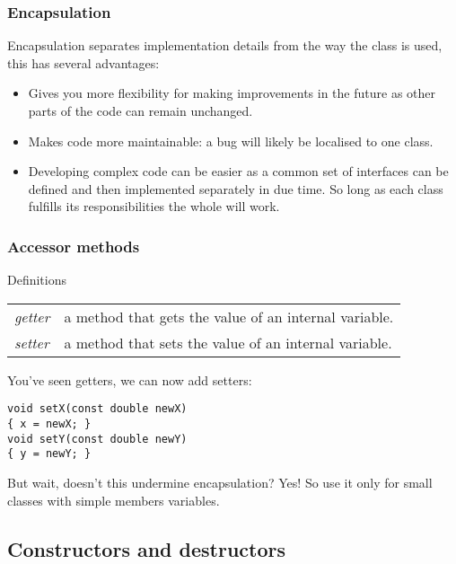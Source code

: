 \documentclass{beamer}
\begin{document}
\begin{frame}[fragile]
  \frametitle{Encapsulation}
  
  Encapsulation separates implementation details from the way the class is used, this has several advantages:
  \pause
  \begin{itemize}
    \item{Gives you more flexibility for making improvements in the future as other parts of the code can remain unchanged.}
    \pause
    \item{Makes code more maintainable: a bug will likely be localised to one class.}
    \pause
    \item{Developing complex code can be easier as a common set of interfaces can be defined and then implemented separately in due time.  So long as each class fulfills its responsibilities the whole will work.}
  \end{itemize}
  \pause

\end{frame}

\begin{frame}[fragile]
  \frametitle{Accessor methods}
  
  \begin{defiblockbaree}{Definitions}
    \begin{tabularx}{\linewidth}{lX}
	    \textit{getter} & a method that gets the value of an internal variable. \\
	    \textit{setter} & a method that sets the value of an internal variable. \\
    \end{tabularx}
  \end{defiblockbaree}
  \pause
  You've seen getters, we can now add setters:
  \begin{lstlisting}
void setX(const double newX)
{ x = newX; }
void setY(const double newY)
{ y = newY; }
  \end{lstlisting}
  \pause
  But wait, doesn't this undermine encapsulation?  Yes!  So use it only for small classes with simple members variables.
\end{frame}

\subsection{Constructors and destructors}
\end{document}
